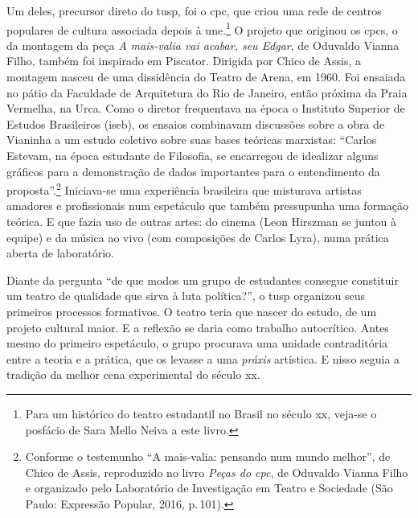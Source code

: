 Um deles, precursor direto do {\sc tusp}, foi o {\sc cpc}, que criou uma rede de
centros populares de cultura associada depois à {\sc une}.\footnote{Para um
  histórico do teatro estudantil no Brasil no século {\sc xx}, veja-se o
  posfácio de Sara Mello Neiva a este livro.} O projeto que originou os
{\sc cpc}s, o da montagem da peça {\it A mais-valia vai acabar, seu Edgar}, de
Oduvaldo Vianna Filho, também foi inspirado em Piscator. Dirigida por
Chico de Assis, a montagem nasceu de uma dissidência do Teatro de Arena,
em 1960. Foi ensaiada no pátio da Faculdade de Arquitetura do Rio de
Janeiro, então próxima da Praia Vermelha, na Urca. Como o diretor
frequentava na época o Instituto Superior de Estudos Brasileiros ({\sc iseb}),
os ensaios combinavam discussões sobre a obra de Vianinha a um estudo
coletivo sobre suas bases teóricas marxistas: “Carlos Estevam, na época
estudante de Filosofia, se encarregou de idealizar alguns gráficos para
a demonstração de dados importantes para o entendimento da
proposta”.\footnote{Conforme o testemunho “A
  mais-valia: pensando num mundo melhor”, de Chico de Assis, reproduzido no livro
  {\it Peças do {\sc cpc}}, de Oduvaldo Vianna Filho e organizado pelo Laboratório de Investigação em Teatro e Sociedade (São Paulo:
  Expressão Popular, 2016, p.\,101).} Iniciava-se uma experiência
brasileira que misturava artistas amadores e profissionais num
espetáculo que também pressupunha uma formação teórica. E que
fazia uso de outras artes: do cinema (Leon Hirszman se juntou à equipe)
e da música ao vivo (com composições de Carlos Lyra), numa prática
aberta de laboratório.


Diante da pergunta “de que modos um grupo de estudantes consegue
constituir um teatro de qualidade que sirva à luta política?”, o {\sc tusp}
organizou seus primeiros processos formativos. O teatro teria que nascer
do estudo, de um projeto cultural maior. E a reflexão se daria como
trabalho autocrítico. Antes mesmo do primeiro espetáculo, o grupo
procurava uma unidade contraditória entre a teoria e a prática, que os
levasse a uma {\it práxis} artística. E nisso seguia a tradição da
melhor cena experimental do século {\sc xx}.

